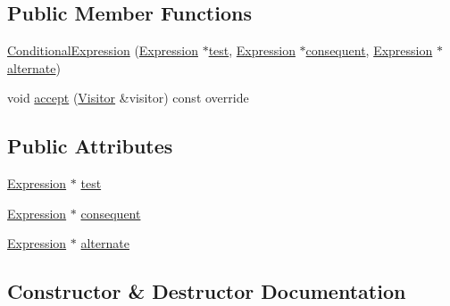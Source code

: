 \subsection*{Public Member Functions}
\begin{DoxyCompactItemize}
\item 
\hyperlink{struct_conditional_expression_a37e1422b06b5533f67a85ceb92e9ae1e}{Conditional\+Expression} (\hyperlink{struct_expression}{Expression} $\ast$\hyperlink{struct_conditional_expression_a7bfe134769078a10eecccabba7405cc2}{test}, \hyperlink{struct_expression}{Expression} $\ast$\hyperlink{struct_conditional_expression_ac129a280df90c129183ec955f4e50ed0}{consequent}, \hyperlink{struct_expression}{Expression} $\ast$\hyperlink{struct_conditional_expression_aed7b09dab98000c8542d6353eefd8dac}{alternate})
\item 
void \hyperlink{struct_conditional_expression_af3883c99eba0226e3fbd424a672bcf7b}{accept} (\hyperlink{struct_visitor}{Visitor} \&visitor) const override
\end{DoxyCompactItemize}
\subsection*{Public Attributes}
\begin{DoxyCompactItemize}
\item 
\hyperlink{struct_expression}{Expression} $\ast$ \hyperlink{struct_conditional_expression_a7bfe134769078a10eecccabba7405cc2}{test}
\item 
\hyperlink{struct_expression}{Expression} $\ast$ \hyperlink{struct_conditional_expression_ac129a280df90c129183ec955f4e50ed0}{consequent}
\item 
\hyperlink{struct_expression}{Expression} $\ast$ \hyperlink{struct_conditional_expression_aed7b09dab98000c8542d6353eefd8dac}{alternate}
\end{DoxyCompactItemize}


\subsection{Constructor \& Destructor Documentation}
\mbox{\label{struct_conditional_expression_a37e1422b06b5533f67a85ceb92e9ae1e}} 
